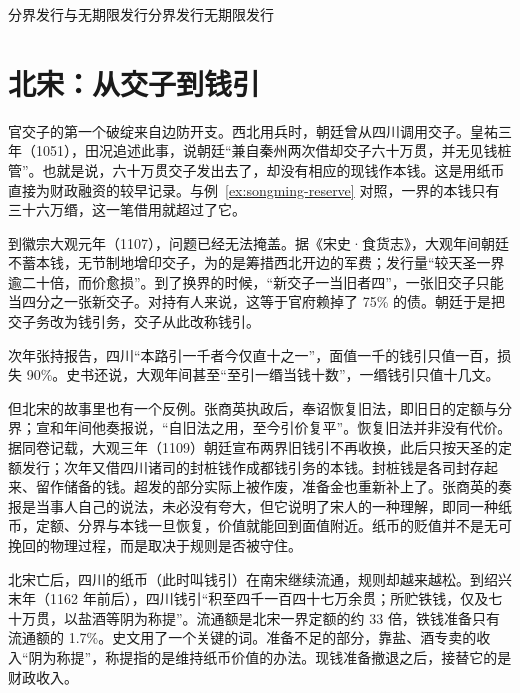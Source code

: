 \begin{compare}{分界发行与无期限发行}{分界发行}{无期限发行}
\end{compare}

\section{北宋：从交子到钱引}\label{sec:songming-north}

官交子的第一个破绽来自边防开支。西北用兵时，朝廷曾从四川调用交子。皇祐三年（1051），田况追述此事，说朝廷“兼自秦州两次借却交子六十万贯，并无见钱桩管”\cite{songchaoshishi}。也就是说，六十万贯交子发出去了，却没有相应的现钱作本钱。这是用纸币直接为财政融资的较早记录。与例~\ref{ex:songming-reserve} 对照，一界的本钱只有三十六万缗，这一笔借用就超过了它。

到徽宗大观元年（1107），问题已经无法掩盖。据《宋史·食货志》，大观年间朝廷不蓄本钱，无节制地增印交子，为的是筹措西北开边的军费；发行量“较天圣一界逾二十倍，而价愈损”\cite{songshi}。到了换界的时候，“新交子一当旧者四”，一张旧交子只能当四分之一张新交子。对持有人来说，这等于官府赖掉了 75\% 的债。朝廷于是把交子务改为钱引务，交子从此改称钱引。

次年张持报告，四川“本路引一千者今仅直十之一”，面值一千的钱引只值一百，损失 90\%。史书还说，大观年间甚至“至引一缗当钱十数”\cite{songshi}，一缗钱引只值十几文。

但北宋的故事里也有一个反例。张商英执政后，奉诏恢复旧法，即旧日的定额与分界；宣和年间他奏报说，“自旧法之用，至今引价复平”\cite{songshi}。恢复旧法并非没有代价。据同卷记载，大观三年（1109）朝廷宣布两界旧钱引不再收换，此后只按天圣的定额发行；次年又借四川诸司的封桩钱作成都钱引务的本钱。封桩钱是各司封存起来、留作储备的钱。超发的部分实际上被作废，准备金也重新补上了。张商英的奏报是当事人自己的说法，未必没有夸大，但它说明了宋人的一种理解，即同一种纸币，定额、分界与本钱一旦恢复，价值就能回到面值附近。纸币的贬值并不是无可挽回的物理过程，而是取决于规则是否被守住。

北宋亡后，四川的纸币（此时叫钱引）在南宋继续流通，规则却越来越松。到绍兴末年（1162 年前后），四川钱引“积至四千一百四十七万余贯；所贮铁钱，仅及七十万贯，以盐酒等阴为称提”\cite{songshi}。流通额是北宋一界定额的约 33 倍，铁钱准备只有流通额的 1.7\%。史文用了一个关键的词。准备不足的部分，靠盐、酒专卖的收入“阴为称提”，称提指的是维持纸币价值的办法。现钱准备撤退之后，接替它的是财政收入。

